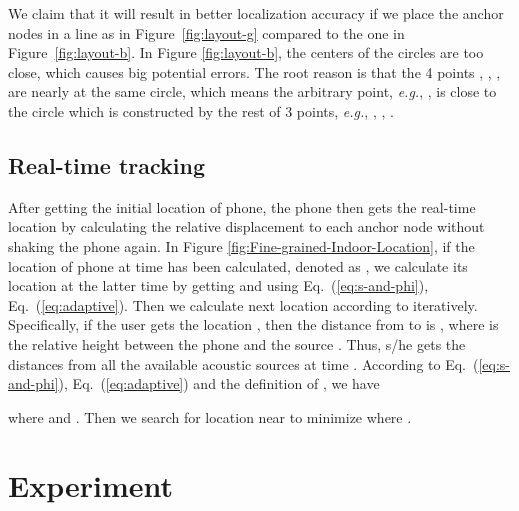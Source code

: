 \documentclass[]{sig-alternate-10pt}
\newcommand{\MYCUT}[1]{{ }}
\def\eg{\textit{e.g.}\xspace}
\newcommand{\eqqref}[1]{Eq.~(\ref{#1})}
\begin{document}
We claim that it will result in better
localization accuracy if we place the anchor nodes in a line as in
Figure~\ref{fig:layout-g} compared to the one in
Figure~\ref{fig:layout-b}.
In Figure \ref{fig:layout-b}, the centers of the
 circles are too close, which causes big potential errors.
The root reason is that the 4 points , , ,  are nearly at the
 same circle, which means the arbitrary point, \eg, , is close to
 the circle which is constructed by the rest of 3 points, \eg, , , .
\MYCUT{\begin{figure}[htb]
\begin{subfigure}[b]{0.22\textwidth}
                \centering
\texttt{[image: goodput-crop]}
                \caption{Good layout}
        \end{subfigure}
\begin{subfigure}[b]{0.2\textwidth}
                \centering
\texttt{[image: badput-crop]}
                \caption{Bad layout}
        \end{subfigure}
\caption{The effect by the layout of the anchor nodes.
    \label{fig:layout}}
\end{figure}
}


\subsection{Real-time tracking}
\label{sec:realtimetracking}
After getting the initial location of phone, the phone then gets the
 real-time location  by  calculating the
 relative displacement to each anchor node without shaking the phone
 again.
In Figure \ref{fig:Fine-grained-Indoor-Location}, if the location of
 phone at time  has been calculated,
 denoted as , we calculate its location 
 at the latter time  by getting  and 
 using \eqqref{eq:s-and-phi}, \eqqref{eq:adaptive}. 
Then we calculate next location according to
  iteratively.
Specifically,
 if the user gets the location , then the distance from 
 to  is
 ,
where  is the relative height between the phone and the source
. Thus, s/he gets the distances from all the available
acoustic sources at time .
According to \eqqref{eq:s-and-phi}, \eqqref{eq:adaptive} and the definition of , we have

where  and . 
Then we search for location
 near  to minimize  where
.


\section{Experiment}
\label{sec:experiment}
\end{document}
